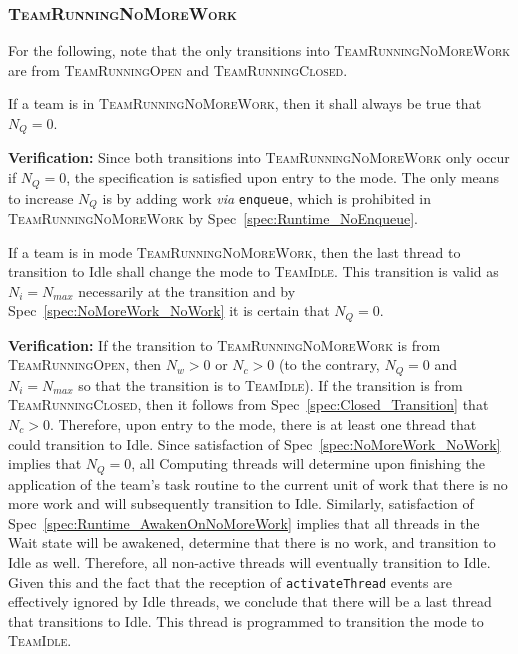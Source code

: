 \documentclass{article}
\newcommand{\TeamIdle}          {\textsc{TeamIdle}}
\newcommand{\TeamRunningOpen}   {\textsc{TeamRunningOpen}}
\newcommand{\TeamRunningClosed} {\textsc{TeamRunningClosed}}
\newcommand{\TeamRunningNoMoreWork} {\textsc{TeamRunningNoMoreWork}}
\newcommand{\taskroutine}        {task routine\xspace}
\begin{document}
\subsubsection{\TeamRunningNoMoreWork}
For the following, note that the only transitions into {\TeamRunningNoMoreWork}
are from {\TeamRunningOpen} and \TeamRunningClosed.

\begin{spec}
\label{spec:NoMoreWork_NoWork}
If a team is in \TeamRunningNoMoreWork, then it shall always be true that $N_Q =
0$.
\end{spec}
\textbf{Verification:}\hspace{0.125in}
Since both transitions into {\TeamRunningNoMoreWork} only occur if $N_Q = 0$,
the specification is satisfied upon entry to the mode.  The only means to
increase $N_Q$ is by adding work \textit{via} \texttt{enqueue}, which is
prohibited in {\TeamRunningNoMoreWork} by Spec~\ref{spec:Runtime_NoEnqueue}.

\begin{spec}
\label{spec:NoMoreWork_TransitionToIdle}
If a team is in mode \TeamRunningNoMoreWork, then the last thread to transition
to Idle shall change the mode to \TeamIdle.  This transition is valid as $N_i =
N_{max}$ necessarily at the transition and by Spec~\ref{spec:NoMoreWork_NoWork}
it is certain that $N_Q = 0$.
\end{spec}
\textbf{Verification:}\hspace{0.125in}  If the transition to
{\TeamRunningNoMoreWork} is from \TeamRunningOpen, then $N_w > 0$ or $N_c > 0$
(to the contrary, $N_Q = 0$ and $N_i = N_{max}$ so that the transition is to
\TeamIdle).  If the transition is from \TeamRunningClosed, then it follows from
Spec~\ref{spec:Closed_Transition} that $N_c > 0$.  Therefore, upon entry to the
mode, there is at least one thread that could transition to Idle.  Since
satisfaction of Spec~\ref{spec:NoMoreWork_NoWork} implies that $N_Q = 0$, all
Computing threads will determine upon finishing the application of the team's
\taskroutine to the current unit of work that there is no more work and will
subsequently transition to Idle.  Similarly, satisfaction of
Spec~\ref{spec:Runtime_AwakenOnNoMoreWork} implies that all threads in the Wait
state will be awakened, determine that there is no work, and transition to Idle
as well.  Therefore, all non-active threads will eventually transition to Idle.
Given this and the fact that the reception of \texttt{activateThread} events are
effectively ignored by Idle threads, we conclude that there will be a last
thread that transitions to Idle.  This thread is programmed to transition the
mode to \TeamIdle.
\end{document}

